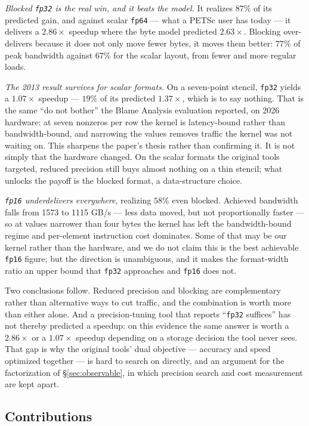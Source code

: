 \documentclass[11pt]{article}
\begin{document}
\emph{Blocked \texttt{fp32} is the real win, and it beats the model.} It realizes
$87\%$ of its predicted gain, and against scalar \texttt{fp64} --- what a PETSc
user has today --- it delivers a $2.86\times$ speedup where the byte model
predicted $2.63\times$. Blocking over-delivers because it does not only move
fewer bytes,
it moves them better: $77\%$ of peak bandwidth against $67\%$ for the scalar
layout, from fewer and more regular loads.

\emph{The 2013 result survives for scalar formats.} On a seven-point stencil,
\texttt{fp32} yields a $1.07\times$ speedup --- $19\%$ of its predicted
$1.37\times$, which is to say nothing. That is the same ``do not bother'' the
Blame Analysis
evaluation reported, on 2026 hardware: at seven nonzeros per row the kernel is
latency-bound rather than bandwidth-bound, and narrowing the values removes
traffic the kernel was not waiting on. This sharpens the paper's thesis rather
than confirming it. It
is not simply that the hardware changed. On the scalar formats the original tools
targeted, reduced precision still buys almost nothing on a thin stencil; what
unlocks the payoff is the blocked format, a data-structure choice.

\emph{\texttt{fp16} underdelivers everywhere}, realizing $58\%$ even blocked.
Achieved bandwidth falls from 1573 to 1115 GB/s --- less data moved, but not
proportionally faster --- so at values narrower than four bytes the kernel has
left the
bandwidth-bound regime and per-element instruction cost dominates. Some of that
may be our kernel rather than the hardware, and we do not claim this is the best
achievable \texttt{fp16} figure; but the direction is unambiguous, and it makes
the format-width ratio an upper bound that \texttt{fp32} approaches and
\texttt{fp16} does not.

Two conclusions follow. Reduced precision and blocking are complementary rather
than alternative ways to cut traffic, and the combination is worth more than
either alone. And a precision-tuning tool that reports ``\texttt{fp32} suffices''
has not thereby predicted a speedup: on this evidence the same answer is worth a
$2.86\times$ or a $1.07\times$ speedup depending on a storage decision the tool
never sees. That gap is why the original tools' dual objective --- accuracy and
speed optimized together --- is hard to search on directly, and an argument for
the factorization of \S\ref{sec:observable}, in which precision search and cost
measurement are kept apart.

\subsection{Contributions}
\end{document}
